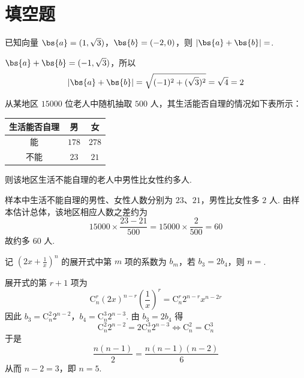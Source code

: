 \section{填空题}

\begin{problem}
已知向量 \( \bs{a} = (1, \sqrt{3}) \)，\( \bs{b} = (-2, 0) \)，则 \( |\bs{a} + \bs{b}| = \)\fillinblank{}.

\begin{solution}
\(\bs{a}+\bs{b}=(-1,\sqrt3)\)，所以
\[
|\bs{a}+\bs{b}|=\sqrt{(-1)^2+(\sqrt3)^2}=\sqrt4=2
\]
\end{solution}
\end{problem}

\begin{problem}
从某地区 \(15000\) 位老人中随机抽取 \(500\) 人，其生活能否自理的情况如下表所示：

\begin{center}
\begin{tabular}{c|cc}
\hline
生活能否自理 & 男 & 女 \\
\hline
能 & \(178\) & \(278\) \\
不能 & \(23\) & \(21\) \\
\hline
\end{tabular}
\end{center}

则该地区生活不能自理的老人中男性比女性约多人\fillinblank{}.

\begin{solution}
样本中生活不能自理的男性、女性人数分别为 \(23\)、\(21\)，男性比女性多 \(2\) 人. 由样本估计总体，该地区相应人数之差约为
\[
15000\times\frac{23-21}{500}=15000\times\frac2{500}=60
\]
故约多 \(60\) 人.
\end{solution}
\end{problem}

\begin{problem}
记 \(\left(2x + \frac{1}{x}\right)^{n}\) 的展开式中第 \(m\) 项的系数为 \(b_{m}\)，若 \(b_{3} = 2b_{4}\)，则 \(n =\)\fillinblank{}.

\begin{solution}
展开式的第 \(r+1\) 项为
\[
\mathrm C_n^r(2x)^{n-r}\left(\frac1x\right)^r
=\mathrm C_n^r2^{n-r}x^{n-2r}
\]
因此 \(b_3=\mathrm C_n^2 2^{n-2}\)，\(b_4=\mathrm C_n^3 2^{n-3}\). 由 \(b_3=2b_4\) 得
\[
\mathrm C_n^2 2^{n-2}=2\mathrm C_n^3 2^{n-3}
\iff \mathrm C_n^2=\mathrm C_n^3
\]
于是
\[
\frac{n(n-1)}2=\frac{n(n-1)(n-2)}6
\]
从而 \(n-2=3\)，即 \(n=5\).
\end{solution}
\end{problem}

